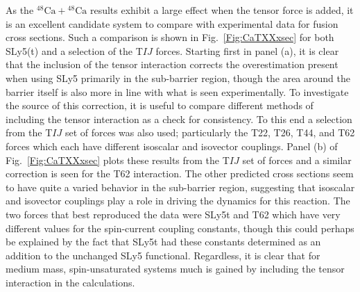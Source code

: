 As the $^{48}\mathrm{Ca}+\mathrm{^{48}Ca}$ results exhibit a large effect when the tensor force is added, it is an excellent candidate system to compare with experimental data for fusion cross sections.
Such a comparison is shown in Fig.~\ref{Fig:CaTXXxsec} for both SLy5(t) and a selection of the T$IJ$ forces.
Starting first in panel (a), it is clear that the inclusion of the tensor interaction corrects the overestimation present when using SLy5 primarily in the sub-barrier region, though the area around the barrier itself is also more in line with what is seen experimentally.
To investigate the source of this correction, it is useful to compare different methods of including the tensor interaction as a check for consistency.
To this end a selection from the T$IJ$ set of forces was also used; particularly the T22, T26, T44, and T62 forces which each have different isoscalar and isovector couplings.
Panel (b) of Fig.~\ref{Fig:CaTXXxsec} plots these results from the T$IJ$ set of forces and a similar correction is seen for the T62 interaction.
The other predicted cross sections seem to have quite a varied behavior in the sub-barrier region, suggesting that isoscalar and isovector couplings play a role in driving the dynamics for this reaction.
The two forces that best reproduced the data were SLy5t and T62 which have very different values for the spin-current coupling constants, though this could perhaps be explained by the fact that SLy5t had these constants determined as an addition to the unchanged SLy5 functional.
Regardless, it is clear that for medium mass, spin-unsaturated systems much is gained by including the tensor interaction in the calculations.

